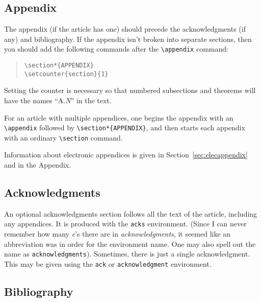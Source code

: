 \documentclass[hyperref]{acmtrans2e}
\begin{document}
\subsection{Appendix}

The appendix (if the article has one) should precede the
acknowledgments (if any) and bibliography.
If the appendix isn't broken into separate sections,
then you should add the following commands after the \verb|\appendix|
command:
\begin{quote}
\begin{verbatim}
\section*{APPENDIX}
\setcounter{section}{1}
\end{verbatim}
\end{quote}
Setting the counter is necessary so that numbered subsections and
theorems will have the names ``A.{\em N\/}'' in the text.

For an article with multiple appendices, one begins
the appendix with an \verb|\appendix| followed by
\verb|\section*{APPENDIX}|, and then starts each
appendix with an ordinary \verb|\section| command.

Information about electronic appendices is given in
Section~\ref{sec:elecappendix} and in the Appendix.

\subsection{Acknowledgments}

An optional acknowledgments section follows all the text of the
article, including any appendices.  It is produced with the
{\tt acks} environment.  (Since I can never remember how many
{\em e\/}'s there are in {\em acknowledgments}, it seemed
like an abbreviation was in order for the environment name.
One may also spell out the name as {\tt acknowledgments}).
Sometimes, there is just a single acknowledgment.
This may be given using the {\tt ack} or {\tt acknowledgment}
environment.

\subsection{Bibliography}
\end{document}
